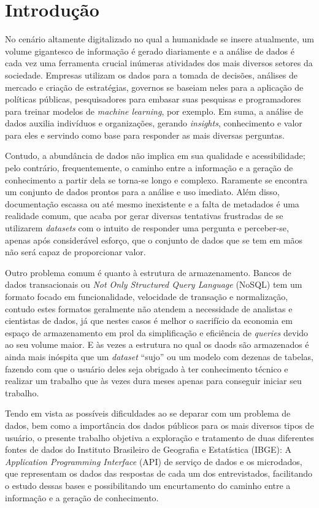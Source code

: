 \chapter{Introdução}

    No cenário altamente digitalizado no qual a humanidade se insere atualmente, um volume gigantesco de informação é gerado diariamente e a análise de dados é cada vez uma ferramenta crucial inúmeras atividades dos mais diversos setores da sociedade. Empresas utilizam os dados para a tomada de decisões, análises de mercado e criação de estratégias, governos se baseiam neles para a aplicação de políticas públicas, pesquisadores para embasar suas pesquisas e programadores para treinar modelos de \textit{machine learning}, por exemplo. Em suma, a análise de dados auxilia indivíduos e organizações, gerando \textit{insights}, conhecimento e valor para eles e servindo como base para responder as mais diversas perguntas.

    Contudo, a abundância de dados não implica em sua qualidade e acessibilidade; pelo contrário, frequentemente, o caminho entre a informação e a geração de conhecimento a partir dela se torna-se longo e complexo. Raramente se encontra um conjunto de dados prontos para a análise e uso imediato. Além disso, documentação escassa ou até mesmo inexistente e a falta de metadados é uma realidade comum, que acaba por gerar diversas tentativas frustradas de se utilizarem \textit{datasets} com o intuito de responder uma pergunta e perceber-se, apenas após considerável esforço, que o conjunto de dados que se tem em mãos não será capaz de proporcionar valor.

    Outro problema comum é quanto à estrutura de armazenamento. Bancos de dados transacionais ou \textit{Not Only Structured Query Language} (NoSQL) tem um formato focado em funcionalidade, velocidade de transação e normalização, contudo estes formatos geralmente não atendem a necessidade de analistas e cientistas de dados, já que nestes casos é melhor o sacrifício da economia em espaço de armazenamento em prol da simplificação e eficiência de \textit{queries} devido ao seu volume maior. E às vezes a estrutura no qual os daods são armazenados é ainda mais inóspita que um \textit{dataset} ``sujo'' ou um modelo com dezenas de tabelas, fazendo com que o usuário deles seja obrigado à ter conhecimento técnico e realizar um trabalho que às vezes dura meses apenas para conseguir iniciar seu trabalho.

    Tendo em vista as possíveis dificuldades ao se deparar com um problema de dados, bem como a importância dos dados públicos para os mais diversos tipos de usuário, o presente trabalho objetiva a exploração e tratamento de duas diferentes fontes de dados do Instituto Brasileiro de Geografia e Estatística (IBGE): A \textit{Application Programming Interface} (API) de serviço de dados \cite{API-IBGE} e os microdados, que representam os dados das respostas de cada um dos entrevistados, facilitando o estudo dessas bases e possibilitando um encurtamento do caminho entre a informação e a geração de conhecimento.


